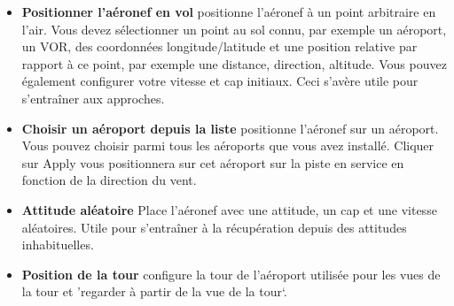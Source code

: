 \begin{itemize}
{\begin{itemize}
   \item \textbf{Positionner l'a\'{e}ronef en vol} positionne l'a\'{e}ronef \`{a} un point arbitraire en l'air. Vous devez s\'{e}lectionner un point au sol connu, par exemple un a\'{e}roport, un VOR, des coordonn\'{e}es longitude/latitude et une position relative par rapport \`{a} ce point, par exemple une distance, direction, altitude. Vous pouvez \'{e}galement configurer votre vitesse et cap initiaux. Ceci s'av\`{e}re utile pour s'entra\^{i}ner aux approches.
   \item \textbf{Choisir un a\'{e}roport depuis la liste} positionne l'a\'{e}ronef sur un a\'{e}roport. Vous pouvez choisir parmi tous les a\'{e}roports que vous avez install\'{e}. Cliquer sur Apply vous positionnera sur cet a\'{e}roport sur la piste en service en fonction de la direction du vent.
   \item \textbf{Attitude al\'{e}atoire} Place l'a\'{e}ronef avec une attitude, un cap et une vitesse al\'{e}atoires. Utile pour s'entra\^{i}ner \`{a} la r\'{e}cup\'{e}ration depuis des attitudes inhabituelles.
   \item \textbf{Position de la tour} configure la tour de l'a\'{e}roport utilis\'{e}e pour les vues de la tour et 'regarder \`{a} partir de la vue de la tour`.
 \end{itemize}
}{}


\end{itemize}
